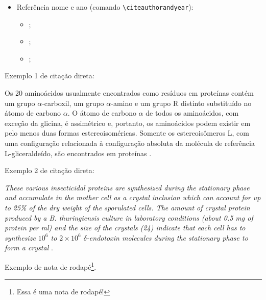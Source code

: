 \begin{itemize}
     	\begin{itemize}
     		\item \cite{Abedi2014, Agaisse1995};
             \item \cite{AgapitoTenfen2014, BtNomenclature2016, Nelson2014};
     	\end{itemize}
     	\item Referência nome e ano (comando \verb|\citeauthorandyear|):
     	\begin{itemize}
     		\item {};
     		\item {};
     		\item {};
     	\end{itemize}
     \end{itemize}
     
     
     Exemplo 1 de citação direta:
     
     \begin{citacao}
     	Os 20 aminoácidos usualmente encontrados como resíduos em proteínas contém um grupo $\alpha$-carboxil, um grupo $\alpha$-amino e um grupo R distinto substituído no átomo de carbono $\alpha$. O átomo de carbono $\alpha$ de todos os aminoácidos, com exceção da glicina, é assimétrico e, portanto, os aminoácidos podem existir em pelo menos duas formas estereoisoméricas. Somente os estereoisômeros L, com uma configuração relacionada à configuração absoluta da molécula de referência L-gliceraldeído, são encontrados em proteínas \cite[p. 81]{Nelson2014}.
     \end{citacao}
     
     Exemplo 2 de citação direta:
     
     \begin{citacao}
     	\textit{These various insecticidal proteins are synthesized during the stationary phase and accumulate in the mother cell as a crystal inclusion which can account for up to 25\% of the dry weight of the sporulated cells. The amount of crystal protein produced by a B. thuringiensis culture in laboratory conditions (about 0.5 mg of protein per ml) and the size of the crystals (24) indicate that each cell has to synthesize $10^6$ to $2 \times 10^6$ $\delta$-endotoxin molecules during the stationary phase to form a crystal} \cite[p. 1]{Agaisse1995}.
     \end{citacao}
     
     Exemplo de nota de rodapé\footnote{Essa é uma nota de rodapé!}.
     

